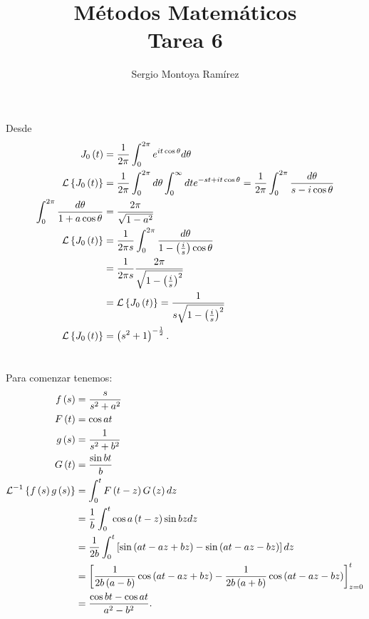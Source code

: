 \documentclass{report}
\title{\Huge{Métodos Matemáticos}\\Tarea 6}
\author{\huge{Sergio Montoya Ramírez}}
\date{}
\begin{document}
\maketitle
\newpage%
\tableofcontents
\pagebreak

\chapter{}

Desde 
\begin{align*}
  J_0\left( t \right) &= \frac{1}{2\pi}\int_{0}^{2\pi}e^{it \cos\theta}d\theta \\
  \operatorname{\mathcal{L}}\left\{ J_0\left( t \right)  \right\} &= \frac{1}{2\pi}\int_{0}^{2\pi} d\theta \int_{0}^{\infty}dt e^{-st + it \cos\theta} = \frac{1}{2\pi}\int_{0}^{2\pi}\frac{d\theta}{s - i \cos\theta} \\
  \int_{0}^{2\pi}\frac{d\theta}{1 + a\cos\theta} &= \frac{2\pi}{\sqrt{1 - a^2} } \\
  \operatorname{\mathcal{L}}\left\{ J_0\left( t \right)  \right\} &= \frac{1}{2\pi s}\int_0^{2\pi}\frac{d\theta}{1 - \left( \frac{i}{s} \right) \cos\theta} \\
  &= \frac{1}{2\pi s} \frac{2\pi}{\sqrt{1 - \left( \frac{i}{s} \right)^2} } \\
  &= \operatorname{\mathcal{L}}\left\{ J_0\left( t \right)  \right\} = \frac{1}{s\sqrt{1 - \left( \frac{i}{s} \right)^2} } \\
  \operatorname{\mathcal{L}}\left\{ J_0\left( t \right)  \right\} &= \left( s^2 + 1 \right)^{-\frac{1}{2}}
.\end{align*}

\chapter{}

Para comenzar tenemos:
\begin{align*}
  f\left( s \right) &= \frac{s}{s^2 + a^2} \\
  F\left( t \right) &= \cos at \\
  g\left( s \right) &= \frac{1}{s^2 + b^2} \\
  G\left( t \right) &= \frac{\sin bt}{b} \\
  \operatorname{\mathcal{L}}^{-1}\left\{ f\left( s \right) g\left( s \right)  \right\} &= \int_{0}^{t} F\left( t - z \right) G\left( z \right) dz \\
  &= \frac{1}{b}\int_{0}^{t}\cos a\left( t - z \right) \sin bz dz \\
  &= \frac{1}{2b}\int_{0}^{t}\left[ \sin\left( at - az + bz \right) - \sin\left( at - az - bz \right)  \right] dz \\
  &= \left[ \frac{1}{2b\left( a - b \right) } \cos\left( at - az + bz \right) - \frac{1}{2b\left( a + b \right) } \cos\left( at - az - bz \right)  \right]_{z = 0}^{t}  \\
  &= \frac{\cos bt - \cos at}{a^2 - b^2}
.\end{align*}
\end{document}
